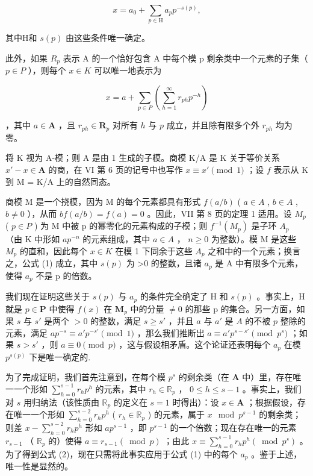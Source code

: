 \[
x = a _ {0} + \sum_ {p \in \mathrm{H}} a _ {p} p ^ {- s (p)},\tag{1}
\]

其中H和 \(s(p)\) 由这些条件唯一确定。

此外，如果 \(R_{p}\) 表示 A 的一个恰好包含 A 中每个模 p 剩余类中一个元素的子集（ \(p \in P\) ），则每个 \(x \in K\) 可以唯一地表示为

\[
x = a + \sum_ {p \in P} \left(\sum_ {h = 1} ^ {\infty} r _ {p h} p ^ {- h}\right)\tag{2}
\]

，其中 \(a \in \mathbf{A}\) ，且 \(r_{ph} \in \mathbf{R}_p\) 对所有 \(h\) 与 \(p\) 成立，并且除有限多个外 \(r_{ph}\) 均为零。

将 K 视为 A-模；则 A 是由 1 生成的子模。商模 K/A 是 K 关于等价关系 \(x' - x \in \mathbf{A}\) 的商，在 VI 第 6 页的记号中也写作 \(x \equiv x' \pmod{1}\) ；设 \(f\) 表示从 K 到 M = K/A 上的自然同态。

商模 M 是一个挠模，因为 M 的每个元素都具有形式 \(f(a/b)\) ( \(a \in A\) , \(b \in A\) , \(b \neq 0\) ），从而 \(bf(a/b) = f(a) = 0\) 。因此，VII 第 8 页的定理 1 适用。设 \(M_{p}\) ( \(p \in P\) ) 为 M 中被 p 的幂零化的元素构成的子模；则 \(f^{-1}(M_{p})\) 是子环 \(A_{p}\) （由 K 中形如 \(ap^{-n}\) 的元素组成，其中 \(a \in A\) ， \(n \geqslant 0\) 为整数）。模 M 是这些 \(M_{p}\) 的直和，因此每个 \(x \in K\) 在模 1 下同余于这些 \(A_{p}\) 之和中的一个元素；换言之，公式 (1) 成立，其中 \(s(p)\) 为 \textgreater0 的整数，且诸 \(a_{p}\) 是 A 中有限多个元素，使得 \(a_{p}\) 不是 p 的倍数。

我们现在证明这些关于 \(s(p)\) 与 \(a_{p}\) 的条件完全确定了 H 和 \(s(p)\) 。事实上，H 就是 \(p \in \mathbf{P}\) 中使得 \(f(x)\) 在 \(\mathbf{M}_{p}\) 中的分量 \(\neq 0\) 的那些 p 的集合。另一方面，如果 \(s\) 与 \(s'\) 是两个 \(>0\) 的整数，满足 \(s \geqslant s'\) ，并且 \(a\) 与 \(a'\) 是 \(A\) 的不被 \(p\) 整除的元素，满足 \(ap^{-s} \equiv a'p^{-s'} \pmod{1}\) ，那么我们推断出 \(a \equiv a'p^{s - s'} \pmod{p^s}\) ；如果 \(s > s'\) ，则 \(a \equiv 0 \pmod{p}\) ，这与假设相矛盾。这个论证还表明每个 \(a_p\) 在模 \(p^{s(p)}\) 下是唯一确定的.

为了完成证明，我们首先注意到，在每个模 \(p^s\) 的剩余类（在 \(\mathbf{A}\) 中）里，存在唯一一个形如 \(\sum_{h=0}^{s-1} r_h p^h\) 的元素，其中 \(r_h \in \mathbb{R}_p\) ， \(0 \leqslant h \leqslant s-1\) 。事实上，我们对 \(s\) 用归纳法（该性质由 \(\mathbb{R}_p\) 的定义在 \(s=1\) 时得出）：设 \(x \in \mathbf{A}\) ；根据假设，存在唯一一个形如 \(\sum_{h=0}^{s-2} r_h p^h\) ( \(r_h \in \mathbb{R}_p\) ) 的元素，属于 \(x \mod p^{s-1}\) 的剩余类；则差 \(x - \sum_{h=0}^{s-2} r_h p^h\) 形如 \(ap^{s-1}\) ，即 \(p^{s-1}\) 的一个倍数；现在存在唯一的元素 \(r_{s-1}\) （ \(\mathbb{R}_p\) 的）使得 \(a \equiv r_{s-1} (\bmod p)\) ；由此 \(x \equiv \sum_{h=0}^{s-1} r_h p^h (\bmod p^s)\) 。为了得到公式 (2)，现在只需将此事实应用于公式 (1) 中的每个 \(a_p\) 。鉴于上述，唯一性是显然的。

